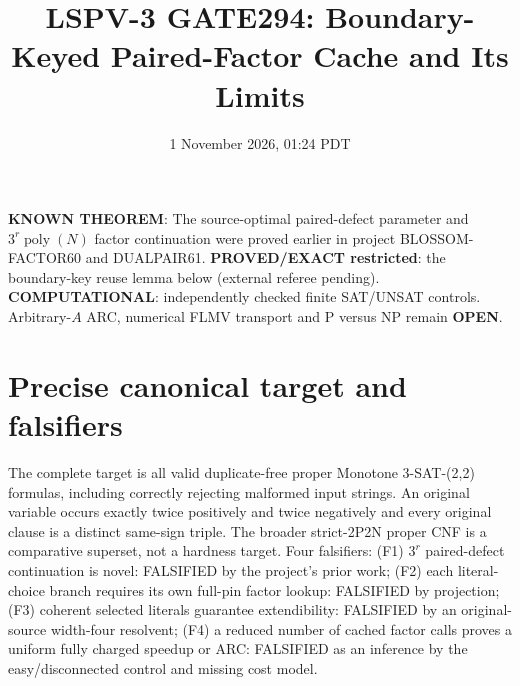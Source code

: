 \documentclass[11pt]{article}
\title{LSPV-3 GATE294: Boundary-Keyed Paired-Factor Cache and Its Limits}
\date{1 November 2026, 01:24 PDT}
\begin{document}
\maketitle
\noindent\textbf{KNOWN THEOREM}: The source-optimal paired-defect parameter and $3^r\operatorname{poly}(N)$ factor continuation were proved earlier in project BLOSSOM-FACTOR60 and DUALPAIR61. \textbf{PROVED/EXACT restricted}: the boundary-key reuse lemma below (external referee pending). \textbf{COMPUTATIONAL}: independently checked finite SAT/UNSAT controls. Arbitrary-$A$ ARC, numerical FLMV transport and P versus NP remain \textbf{OPEN}.
\section{Precise canonical target and falsifiers}
The complete target is all valid duplicate-free proper Monotone 3-SAT-(2,2) formulas, including correctly rejecting malformed input strings. An original variable occurs exactly twice positively and twice negatively and every original clause is a distinct same-sign triple. The broader strict-2P2N proper CNF is a comparative superset, not a hardness target.
Four falsifiers: (F1) $3^r$ paired-defect continuation is novel: FALSIFIED by the project's prior work; (F2) each literal-choice branch requires its own full-pin factor lookup: FALSIFIED by projection; (F3) coherent selected literals guarantee extendibility: FALSIFIED by an original-source width-four resolvent; (F4) a reduced number of cached factor calls proves a uniform fully charged speedup or ARC: FALSIFIED as an inference by the easy/disconnected control and missing cost model.
\end{document}
